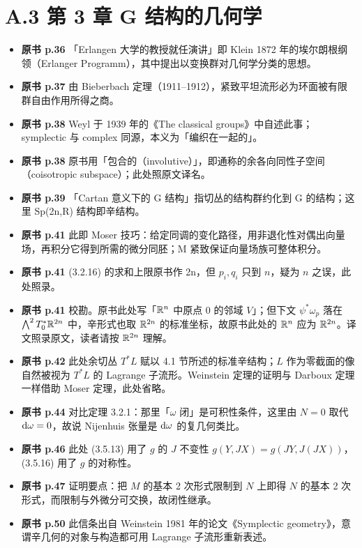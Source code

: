\section*{A.3 第 3 章 G 结构的几何学}
\begin{itemize}[leftmargin=2.4em,itemsep=4pt,label={\textbullet}]
\item \textbf{原书 p.36} 「Erlangen 大学的教授就任演讲」即 Klein 1872 年的埃尔朗根纲领（Erlanger Programm），其中提出以变换群对几何学分类的思想。
\item \textbf{原书 p.37} 由 Bieberbach 定理（1911–1912），紧致平坦流形必为环面被有限群自由作用所得之商。
\item \textbf{原书 p.38} Weyl 于 1939 年的《The classical groups》中自述此事；symplectic 与 complex 同源，本义为「编织在一起的」。
\item \textbf{原书 p.38} 原书用「包合的（involutive）」，即通称的余各向同性子空间（coisotropic subspace）；此处照原文译名。
\item \textbf{原书 p.39} 「Cartan 意义下的 G 结构」指切丛的结构群约化到 G 的结构；这里 Sp(2n,R) 结构即辛结构。
\item \textbf{原书 p.41} 此即 Moser 技巧：给定同调的变化路径，用非退化性对偶出向量场，再积分它得到所需的微分同胚；M 紧致保证向量场族可整体积分。
\item \textbf{原书 p.41} (3.2.16) 的求和上限原书作 2n，但 $p_i,q_i$ 只到 $n$，疑为 $n$ 之误，此处照录。
\item \textbf{原书 p.41} 校勘。原书此处写「$\mathbb{R}^n$ 中原点 $0$ 的邻域 $V$」；但下文 $\psi^*\omega_p$ 落在 $\bigwedge^2T_0^*\mathbb{R}^{2n}$ 中，辛形式也取 $\mathbb{R}^{2n}$ 的标准坐标，故原书此处的 $\mathbb{R}^n$ 应为 $\mathbb{R}^{2n}$。译文照录原文，读者请按 $\mathbb{R}^{2n}$ 理解。
\item \textbf{原书 p.42} 此处余切丛 $T^*L$ 赋以 4.1 节所述的标准辛结构；$L$ 作为零截面的像自然被视为 $T^*L$ 的 Lagrange 子流形。Weinstein 定理的证明与 Darboux 定理一样借助 Moser 定理，此处省略。
\item \textbf{原书 p.44} 对比定理 3.2.1：那里「$\omega$ 闭」是可积性条件，这里由 $N=0$ 取代 $\mathrm{d}\omega=0$，故说 Nijenhuis 张量是 $\mathrm{d}\omega$ 的复几何类比。
\item \textbf{原书 p.46} 此处 (3.5.13) 用了 $g$ 的 $J$ 不变性 $g(Y,JX)=g(JY,J(JX))$，(3.5.16) 用了 $g$ 的对称性。
\item \textbf{原书 p.47} 证明要点：把 $M$ 的基本 2 次形式限制到 $N$ 上即得 $N$ 的基本 2 次形式，而限制与外微分可交换，故闭性继承。
\item \textbf{原书 p.50} 此信条出自 Weinstein 1981 年的论文《Symplectic geometry》，意谓辛几何的对象与构造都可用 Lagrange 子流形重新表述。
\end{itemize}

